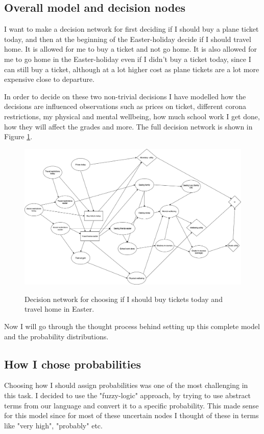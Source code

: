 \documentclass[11pt, a4paper, english]{../Template/NTNUoving}
\begin{document}
\begin{oppgave}

    \section{Overall model and decision nodes}
    I want to make a decision network for first deciding if I should buy a plane ticket today, and then at the beginning of
    the Easter-holiday decide if I should travel home. It is allowed for me to buy a ticket and not go home. It is also allowed for me
    to go home in the Easter-holiday even if I didn't buy a ticket today, since I can still buy a ticket, although at a lot higher cost as plane tickets are
    a lot more expensive close to departure.

    In order to decide on these two non-trivial decisions I have modelled how the decisions are influenced observations such as prices on ticket, different corona restrictions, my physical and mental wellbeing,
    how much school work I get done, how they will affect the grades and more. The full decision network is shown in Figure \ref{fig:2}.

    \begin{figure}[H]
        \centering
        \includegraphics[width=\textwidth]{Task3_2.png}
        \label{fig:2}
        \caption{Decision network for choosing if I should buy tickets today and travel home in Easter.}
    \end{figure}

    Now I will go through the thought process behind setting up this complete model and the probability distributions.

    \subsection{How I chose probabilities}
    Choosing how I should assign probabilities was one of the most challenging in this task.
    I decided to use the "fuzzy-logic" approach, by trying to use abstract terms from our language and convert it to a specific
    probability. This made sense for this model since for most of these uncertain nodes I thought of these in terms like "very high", "probably" etc.



\end{oppgave}
\end{document}
